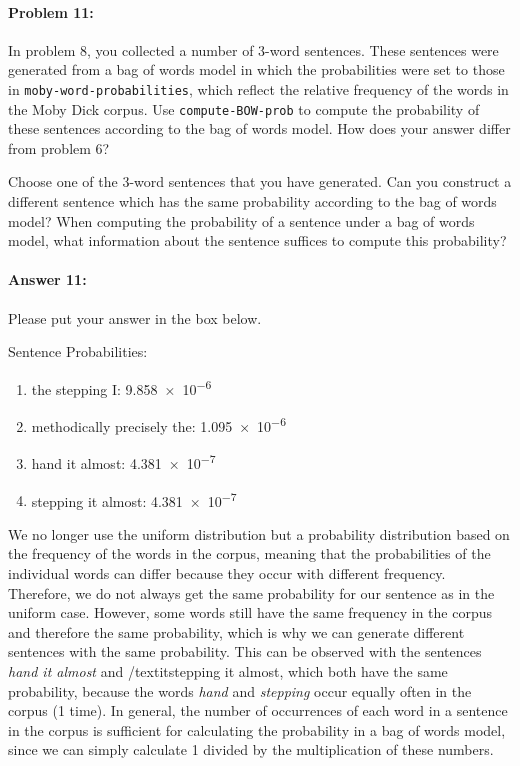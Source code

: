 \documentclass[10pt]{article}
\newenvironment{AnswerBox}{\begin{mdframed}[style=simple]}{\end{mdframed}}
\begin{document}
\hrulefill %

\paragraph{Problem 11:}

In problem 8, you collected a number of 3-word sentences. These
sentences were generated from a bag of words model in which the
probabilities were set to those in \texttt{moby-word-probabilities},
which reflect the relative frequency of the words in the Moby Dick
corpus. Use \texttt{compute-BOW-prob} to compute the probability of
these sentences according to the bag of words model. How does your
answer differ from problem 6?

Choose one of the 3-word sentences that you have generated. Can you
construct a different sentence which has the same probability
according to the bag of words model? When computing the probability of
a sentence under a bag of words model, what information about the
sentence suffices to compute this probability?

\paragraph{Answer 11:} Please put your answer in the box below.

\begin{AnswerBox}%

    Sentence Probabilities: 
    \begin{enumerate}
      \item the stepping I: \num{9.858e-6}
      \item methodically precisely the: \num{1.095e-6}
      \item hand it almost: \num{4.381e-7}
      \item stepping it almost: \num{4.381e-7}
    \end{enumerate}
    We no longer use the uniform distribution but a probability distribution based on the frequency of the words in the corpus, meaning that the probabilities of the individual words can differ because they occur with different frequency. Therefore, we do not always get the same probability for our sentence as in the uniform case. However, some words still have the same frequency in the corpus and therefore the same probability, which is why we can generate different sentences with the same probability. This can be observed with the sentences \textit{hand it almost} and /textit{stepping it almost}, which both have the same probability, because the words \textit{hand} and \textit{stepping} occur equally often in the corpus (1 time). In general, the number of occurrences of each word in a sentence in the corpus is sufficient for calculating the probability in a bag of words model, since we can simply calculate 1 divided by the multiplication of these numbers.

\end{AnswerBox}%
\end{document}
